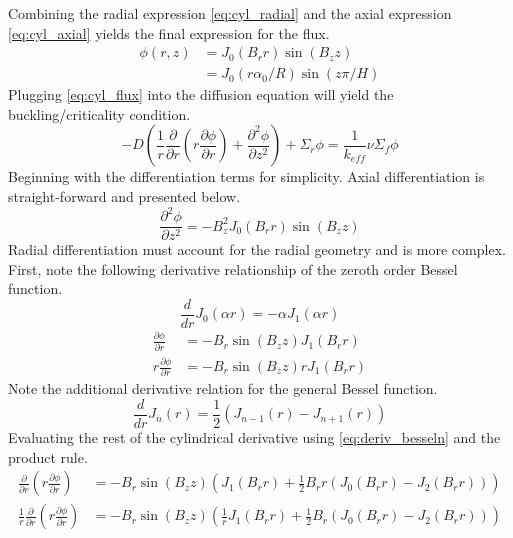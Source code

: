 \documentclass{article}
\begin{document}
  Combining the radial expression \eqref{eq:cyl_radial} and the axial 
  expression \eqref{eq:cyl_axial} yields the final expression for the flux.
  \begin{align} \label{eq:cyl_flux}
    \phi(r,z) &= J_0(B_r r) \sin(B_z z) \\
    &= J_0(r \alpha_0 / R) \sin(z \pi / H)
  \end{align}
  Plugging \eqref{eq:cyl_flux} into the diffusion equation will yield the 
  buckling/criticality condition.
  \begin{equation}
    -D \left( \frac{1}{r} \frac{\partial}{\partial r} \left( r 
      \frac{\partial \phi}{\partial r} \right) + \frac{\partial^2 \phi}
      {\partial z^2} \right) + \Sigma_r \phi = \frac{1}{k_{eff}} \nu 
      \Sigma_f \phi
  \end{equation}
  Beginning with the differentiation terms for simplicity. Axial 
  differentiation is straight-forward and presented below.
  \begin{equation}
    \frac{\partial^2 \phi}{\partial z^2} = -B_z^2 J_0(B_r r) \sin(B_z z)
  \end{equation}
  Radial differentiation must account for the radial geometry and is more 
  complex. First, note the following derivative relationship of the zeroth
  order Bessel function.
  \begin{equation} \label{eq:deriv_bessel0}
    \frac{d}{dr} J_0(\alpha r) = - \alpha J_1(\alpha r)
  \end{equation}
  \begin{align}
    \frac{\partial \phi}{\partial r} &= -B_r \sin(B_z z) J_1(B_r r) \\
    r \frac{\partial \phi}{\partial r} &= -B_r \sin(B_z z) r J_1 (B_r r) 
  \end{align}
  Note the additional derivative relation for the general Bessel function.
  \begin{equation} \label{eq:deriv_besseln}
    \frac{d}{dr} J_n(r) = \frac{1}{2} \left( J_{n-1}(r) - J_{n+1}(r)\right)
  \end{equation}
  Evaluating the rest of the cylindrical derivative using
  \eqref{eq:deriv_besseln} and the product rule.
  \begin{align}
    \frac{\partial}{\partial r} \left( r \frac{\partial \phi}{\partial r}
      \right) &= -B_r \sin(B_z z) \left(J_1(B_r r) + \frac{1}{2} B_r r \left(
      J_0(B_r r) - J_2(B_r r) \right) \right) \\
    \frac{1}{r} \frac{\partial}{\partial r} \left(r 
      \frac{\partial \phi}{\partial r} \right) &=
      -B_r \sin(B_z z) \left(\frac{1}{r} J_1(B_r r) + \frac{1}{2} B_r \left(
      J_0(B_r r) - J_2(B_r r) \right) \right)
  \end{align}
\end{document}
